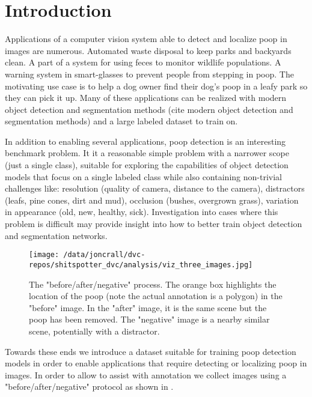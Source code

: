 \documentclass[10pt,twocolumn,letterpaper]{article}
\begin{document}
\section{Introduction}
\label{sec:intro}

Applications of a computer vision system able to detect and localize poop in
images are numerous.
Automated waste disposal to keep parks and backyards clean.
A part of a system for using feces to monitor wildlife populations.
A warning system in smart-glasses to prevent people from stepping in poop.
The motivating use case is to help a dog owner find their dog's poop in a leafy
park so they can pick it up.
Many of these applications can be realized with modern object detection and
segmentation methods (cite modern object detection and segmentation methods)
and a large labeled dataset to train on.


In addition to enabling several applications, poop detection is an interesting benchmark problem. 
It it a reasonable simple problem with a narrower scope (just a single class),
suitable for exploring the capabilities of object detection models that focus
on a single labeled class while also containing non-trivial challenges like:
resolution (quality of camera, distance to the camera),
distractors (leafs, pine cones, dirt and mud),
occlusion (bushes, overgrown grass),
variation in appearance (old, new, healthy, sick).
Investigation into cases where this problem is difficult may provide insight
into how to better train object detection and segmentation networks.


\begin{figure}[h]
\centering
\texttt{[image: /data/joncrall/dvc-repos/shitspotter\_dvc/analysis/viz\_three\_images.jpg]}
\caption[]{
    The "before/after/negative" process.
    The orange box highlights the location of the poop (note the
    actual annotation is a polygon) in the "before" image.
    In the "after" image, it is the same scene but the poop has been removed.
    The "negative" image is a nearby similar scene, potentially with a distractor.
}
\label{fig:ThreeImages}
\end{figure}

Towards these ends we introduce a dataset suitable for training poop detection
models in order to enable applications that require detecting or localizing
poop in images. In order to allow to assist with annotation we collect images
using a "before/after/negative" protocol as shown in . 
\end{document}
